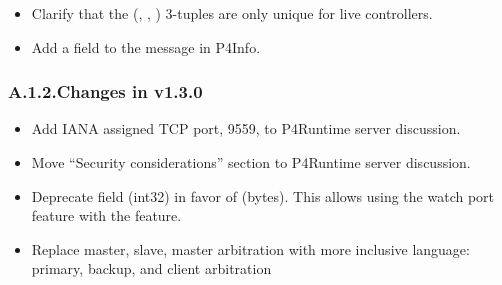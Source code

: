 \documentclass[11pt]{article}
\begin{document}
{\begin{itemize}[noitemsep,topsep=\mdcompacttopsep]
\item{}Clarify that the (, , ) 3-tuples are only unique
for live controllers.%

\item{}Add a  field to the  message
in P4Info.%
\end{itemize}%

\subsubsection{A.1.2.\hspace*{0.5em}Changes in v1.3.0}\label{sec-changes-in-v130}%

\begin{itemize}[noitemsep,topsep=\mdcompacttopsep]%

\item{}Add IANA assigned TCP port, 9559, to P4Runtime server discussion.%

\item{}Move \textquotedblleft{}Security considerations\textquotedblright{} section to P4Runtime server discussion.%

\item{}Deprecate  field (int32) in favor of  (bytes). This allows
using the watch port feature with the  feature.%

\item{}Replace master, slave, master arbitration with more inclusive language:
primary, backup, and client arbitration%


\end{itemize}}
\end{document}
